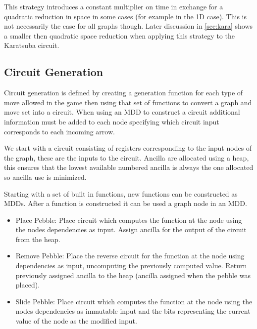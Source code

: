 This strategy introduces a constant multiplier on time in exchange for a
quadratic reduction in space in some cases (for example in the 1D case). This
is not necessarily the case for all graphs though. Later discussion in
\cref{sec:kara} shows a smaller then quadratic space reduction when applying
this strategy to the Karatsuba circuit.

\subsection{Circuit Generation}

Circuit generation is defined by creating a generation function for each type
of move allowed in the game then using that set of functions to convert a graph
and move set into a circuit. When using an MDD to construct a circuit additional
information must be added to each node specifying which circuit input
corresponds to each incoming arrow.

We start with a circuit consisting of registers corresponding to the input
nodes of the graph, these are the inputs to the circuit. Ancilla are allocated
using a heap\footnotemark, this ensures that the lowest available numbered
ancilla is always the one allocated so ancilla use is minimized.


Starting with a set of built in functions, new functions can be constructed as
MDDs. After a function is constructed it can be used a graph node in an MDD.

\begin{itemize}

    \item Place Pebble: Place circuit which computes the function at the node
	    using the nodes dependencies as input. Assign ancilla for the
	    output of the circuit from the heap.

    \item Remove Pebble: Place the reverse circuit for the function at the node
	    using dependencies as input, uncomputing the previously computed
	    value.  Return previously assigned ancilla to the heap (ancilla
	    assigned when the pebble was placed).

    \item Slide Pebble: Place circuit which computes the function at the node
	    using the nodes dependencies as immutable input and the bits representing the
	    current value of the node as the modified input.

\end{itemize}

